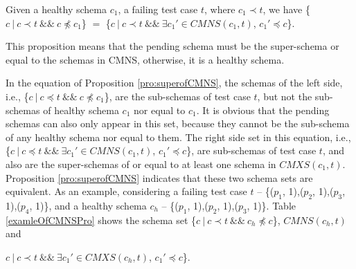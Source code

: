 \documentclass{sig-alternate-05-2015}
\begin{document}
\begin{proposition}\label{pro:superofCMNS}
Given a healthy schema $c_{1}$, a failing test case $t$, where $c_{1} \prec t$, we have \{$c\ |\ c \prec t\ \&\&\ c \npreceq c_{1}$\} $=$  \{$ c\ |\ c \prec t \  \&\& \ \exists c_{1}' \in CMNS(c_{1}, t)$, $c_{1}' \preceq c$\}.
\end{proposition}

This proposition means that the pending schema must be the super-schema or equal to the schemas in CMNS, otherwise, it is a healthy schema.

In the equation of Proposition \ref{pro:superofCMNS}, the schemas of the left side, i.e., \{$c\ |\ c \preceq t\ \&\&\ c \npreceq c_{1}$\}, are the sub-schemas of test case $t$, but not the sub-schemas of healthy schema $c_{1}$ nor equal to $c_{1}$.  It is obvious that the pending schemas can also only appear in this set, because they cannot be the sub-schema of any healthy schema nor equal to them. The right side set in this equation, i.e.,\{$ c\ |\ c \preceq t \  \&\& \ \exists c_{1}' \in CMNS(c_{1}, t)$, $c_{1}' \preceq c$\}, are sub-schemas of test case $t$, and also are the super-schemas of or equal to at least one schema in $CMXS(c_{1}, t)$. Proposition \ref{pro:superofCMNS} indicates that these two schema sets are equivalent. As an example, considering a failing test case $t$ -- \{($p_{1}$, 1),($p_{2}$, 1),($p_{3}$, 1),($p_{4}$, 1)\}, and a healthy schema $c_{h}$ --  \{($p_{1}$, 1),($p_{2}$, 1),($p_{3}$, 1)\}. Table \ref{examleOfCMNSPro} shows the schema set  \{$c\ |\ c \prec t\ \&\&\ c_{h} \npreceq c$\}, $CMNS(c_{h}, t)$ and {$ c\ |\ c \prec t\ \&\& \ \exists c_{1}' \in CMXS(c_{h}, t)$, $c_{1}' \preceq c$\}.

}
\end{document}
